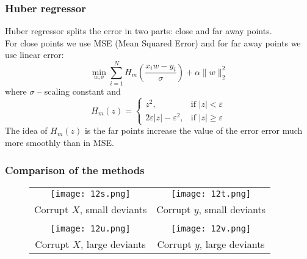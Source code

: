 \subsubsection*{Huber regressor} 

Huber regressor splits the error in two parts: close and far away points. \\
For close points we use MSE (Mean Squared Error) and for far away points we use linear error:
$$\min\limits_{w,\sigma}\sum\limits_{i=1}^{N}H_{m}\left(\frac{x_iw-y_i}{\sigma}\right)+\alpha\|w\|_2^2$$
where $\sigma$ -- scaling constant and 
$$H_m(z)=\begin{cases}
	z^2, & \text{if } |z|<\varepsilon \\
	2\varepsilon|z|-\varepsilon^2, & \text{if } |z|\ge\varepsilon
\end{cases}$$
The idea of $H_m(z)$ is the far points increase the value of the error error much more smoothly than in MSE.

\subsubsection*{Comparison of the methods}

\begin{figure}[H]
  \centering
  \begin{tabular}{cc}
    \texttt{[image: 12s.png]} & \hspace{1cm}
    \texttt{[image: 12t.png]} \\
    Corrupt $X$, small deviants & \hspace{1cm}
     Corrupt $y$, small deviants \\
    & \\
    \texttt{[image: 12u.png]} & \hspace{1cm}
    \texttt{[image: 12v.png]} \\
    Corrupt $X$, large deviants & \hspace{1cm}
    Corrupt $y$, large deviants \\
  \end{tabular}
\end{figure}